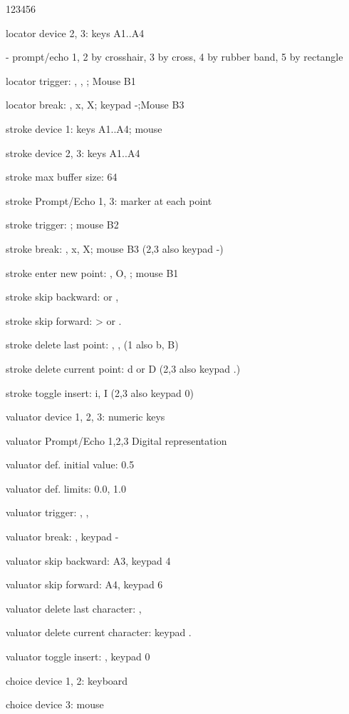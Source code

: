 \begin{DLtt}{123456}
\item[locator device 2, 3:]keys A1..A4
\item[-]prompt/echo 1, 2 by crosshair, 3 by cross, 4 by rubber band,
5 by rectangle
\item[locator trigger:], , ; Mouse B1
\item[locator break:], x, X; keypad -;Mouse B3
\item[stroke device 1:]keys A1..A4; mouse
\item[stroke device 2, 3:]keys A1..A4
\item[stroke max buffer size:]64
\item[stroke Prompt/Echo 1, 3:]marker at each point
\item[stroke trigger:]; mouse B2
\item[stroke break:], x, X; mouse B3 (2,3 also keypad -)
\item[stroke enter new point:], O, ; mouse B1
\item[stroke skip backward:]\Lit{<} or ,
\item[stroke skip forward:]> or .
\item[stroke delete last point:], , (1 also b, B)
\item[stroke delete current point:]d or D (2,3 also keypad .)
\item[stroke toggle insert:]i, I (2,3 also keypad 0)
\item[valuator device 1, 2, 3:]numeric keys
\item[valuator Prompt/Echo 1,2,3]Digital representation
\item[valuator def. initial value:]0.5
\item[valuator def. limits:]0.0, 1.0
\item[valuator trigger:], , 
\item[valuator break:], keypad -
\item[valuator skip backward:]A3, keypad 4
\item[valuator skip forward:]A4, keypad 6
\item[valuator delete last character:], 
\item[valuator delete current character:]keypad .
\item[valuator toggle insert:], keypad 0
\item[choice device 1, 2:]keyboard
\item[choice device 3:]mouse

\end{DLtt}
